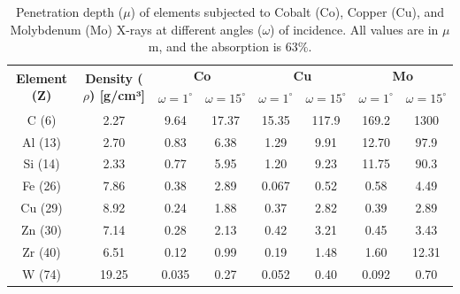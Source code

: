 \documentclass{article}
\begin{document}
\begin{table}[h]
	\centering
	\begin{tabular}{|c|c|cc|cc|cc|}
	\hline
	\multirow{2}{*}{\textbf{Element (Z)}} &
	  \multirow{2}{*}{\textbf{Density ($\rho$) {[}g/cm³{]}}} &
	  \multicolumn{2}{c|}{\textbf{Co}} &
	  \multicolumn{2}{c|}{\textbf{Cu}} &
	  \multicolumn{2}{c|}{\textbf{Mo}} \\ \cline{3-8} 
	 &
	   &
	  \multicolumn{1}{c|}{$\omega = 1^{\circ}$} &
	  $\omega = 15^{\circ}$ &
	  \multicolumn{1}{c|}{$\omega = 1^{\circ}$} &
	  $\omega = 15^{\circ}$ &
	  \multicolumn{1}{c|}{$\omega = 1^{\circ}$} &
	  $\omega = 15^{\circ}$ \\ \hline
	C (6)   & 2.27  & \multicolumn{1}{c|}{9.64}  & 17.37 & \multicolumn{1}{c|}{15.35} & 117.9 & \multicolumn{1}{c|}{169.2} & 1300  \\ \hline
	Al (13) & 2.70  & \multicolumn{1}{c|}{0.83}  & 6.38  & \multicolumn{1}{c|}{1.29}  & 9.91  & \multicolumn{1}{c|}{12.70} & 97.9  \\ \hline
	Si (14) & 2.33  & \multicolumn{1}{c|}{0.77}  & 5.95  & \multicolumn{1}{c|}{1.20}  & 9.23  & \multicolumn{1}{c|}{11.75} & 90.3  \\ \hline
	Fe (26) & 7.86  & \multicolumn{1}{c|}{0.38}  & 2.89  & \multicolumn{1}{c|}{0.067} & 0.52  & \multicolumn{1}{c|}{0.58}  & 4.49  \\ \hline
	Cu (29) & 8.92  & \multicolumn{1}{c|}{0.24}  & 1.88  & \multicolumn{1}{c|}{0.37}  & 2.82  & \multicolumn{1}{c|}{0.39}  & 2.89  \\ \hline
	Zn (30) & 7.14  & \multicolumn{1}{c|}{0.28}  & 2.13  & \multicolumn{1}{c|}{0.42}  & 3.21  & \multicolumn{1}{c|}{0.45}  & 3.43  \\ \hline
	Zr (40) & 6.51  & \multicolumn{1}{c|}{0.12}  & 0.99  & \multicolumn{1}{c|}{0.19}  & 1.48  & \multicolumn{1}{c|}{1.60}  & 12.31 \\ \hline
	W (74)  & 19.25 & \multicolumn{1}{c|}{0.035} & 0.27  & \multicolumn{1}{c|}{0.052} & 0.40  & \multicolumn{1}{c|}{0.092} & 0.70  \\ \hline
	\end{tabular}
	\label{tab:penetrationdepth}
	\caption{Penetration depth ($\mu$) of elements subjected to Cobalt (Co), Copper (Cu), and Molybdenum (Mo) X-rays at different angles ($\omega$) of incidence. All values are in $\mu$m, and the absorption is $63 \%$. \cite{lotharspie_2019_moderne}}
\end{table}



\pagebreak{}
\end{document}
